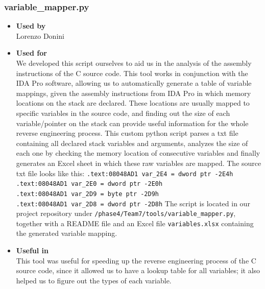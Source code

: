 \subsubsection*{variable\_mapper.py}
\begin{itemize}
	\item \textbf{Used by}\\ Lorenzo Donini
	\item \textbf{Used for}\\ We developed this script ourselves to aid us in the analysis of the assembly instructions of the C source code. 
	This tool works in conjunction with the IDA Pro software, allowing us to automatically generate a table of variable mappings, given the assembly instructions from IDA Pro in which memory locations on the stack are declared. These locations are usually mapped to specific variables in the source code, and finding out the size of each variable/pointer on the stack can provide useful information for the whole reverse engineering process.\newline
	This custom python script parses a txt file containing all declared stack variables and arguments, analyzes the size of each one by checking the memory location of consecutive variables and finally generates an Excel sheet in which these raw variables are mapped.\newline
	The source txt file looks like this:\newline
	\texttt{.text:08048AD1 var\_2E4         = dword ptr -2E4h \\
		.text:08048AD1 var\_2E0         = dword ptr -2E0h \\
		.text:08048AD1 var\_2D9         = byte ptr -2D9h \\
		.text:08048AD1 var\_2D8         = dword ptr -2D8h}\newline
	The script is located in our project repository under \texttt{/phase4/Team7/tools/variable\_mapper.py}, together with a README file and an Excel file \texttt{variables.xlsx} containing the generated variable mapping.
	
	\item \textbf{Useful in}\\ This tool was useful for speeding up the reverse engineering process of the C source code, since it allowed us to have a lookup table for all variables; it also helped us to figure out the types of each variable.
\end{itemize}

